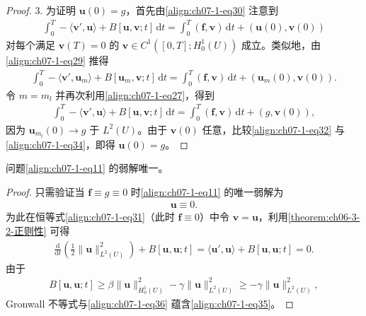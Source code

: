 \documentclass[../../main.tex]{subfiles}
\begin{document}
\begin{proof}
3. 为证明 $\mathbf{u}(0)=g$，首先由\eqref{align:ch07-1-eq30} 注意到
\begin{align}
\int_0^T -\langle\mathbf{v}',\mathbf{u}\rangle + B[\mathbf{u},\mathbf{v};t]\,\mathrm{d}t = \int_0^T (\mathbf{f},\mathbf{v})\,\mathrm{d}t + (\mathbf{u}(0),\mathbf{v}(0))\label{align:ch07-1-eq32}
\end{align}
对每个满足 $\mathbf{v}(T)=0$ 的 $\mathbf{v}\in C^1([0,T];H^1_0(U))$ 成立。类似地，由\eqref{align:ch07-1-eq29} 推得
\begin{align}
\int_0^T -\langle\mathbf{v}',\mathbf{u}_m\rangle + B[\mathbf{u}_m,\mathbf{v};t]\,\mathrm{d}t = \int_0^T (\mathbf{f},\mathbf{v})\,\mathrm{d}t + (\mathbf{u}_m(0),\mathbf{v}(0)).\label{align:ch07-1-eq33}
\end{align}
令 $m=m_l$ 并再次利用\eqref{align:ch07-1-eq27}，得到
\begin{align}
\int_0^T -\langle\mathbf{v}',\mathbf{u}\rangle + B[\mathbf{u},\mathbf{v};t]\,\mathrm{d}t = \int_0^T (\mathbf{f},\mathbf{v})\,\mathrm{d}t + (g,\mathbf{v}(0)),\label{align:ch07-1-eq34}
\end{align}
因为 $\mathbf{u}_{m_l}(0)\to g$ 于 $L^2(U)$。由于 $\mathbf{v}(0)$ 任意，比较\eqref{align:ch07-1-eq32} 与\eqref{align:ch07-1-eq34}，即得 $\mathbf{u}(0)=g$。
\end{proof}

\begin{theorem}[弱解的唯一性。]\label{theorem:ch07-1-弱解的唯一性}问题\eqref{align:ch07-1-eq11} 的弱解唯一。
\end{theorem}

\begin{proof}
只需验证当 $\mathbf{f}\equiv g\equiv 0$ 时\eqref{align:ch07-1-eq11} 的唯一弱解为
\begin{align}
\mathbf{u}\equiv 0.\label{align:ch07-1-eq35}
\end{align}
为此在恒等式\eqref{align:ch07-1-eq31}（此时 $\mathbf{f}\equiv 0$）中令 $\mathbf{v}=\mathbf{u}$，利用\cref{theorem:ch06-3-2-正则性} 可得
\begin{align}
\frac{\mathrm{d}}{\mathrm{d}t}\left(\frac12\|\mathbf{u}\|_{L^2(U)}^2\right) + B[\mathbf{u},\mathbf{u};t] = \langle\mathbf{u}',\mathbf{u}\rangle + B[\mathbf{u},\mathbf{u};t] = 0.\label{align:ch07-1-eq36}
\end{align}
由于
\begin{align*}
B[\mathbf{u},\mathbf{u};t] \geqslant \beta\|\mathbf{u}\|_{H^1_0(U)}^2 - \gamma\|\mathbf{u}\|_{L^2(U)}^2 \geqslant -\gamma\|\mathbf{u}\|_{L^2(U)}^2,
\end{align*}
Gronwall 不等式与\eqref{align:ch07-1-eq36} 蕴含\eqref{align:ch07-1-eq35}。
\end{proof}
\end{document}
